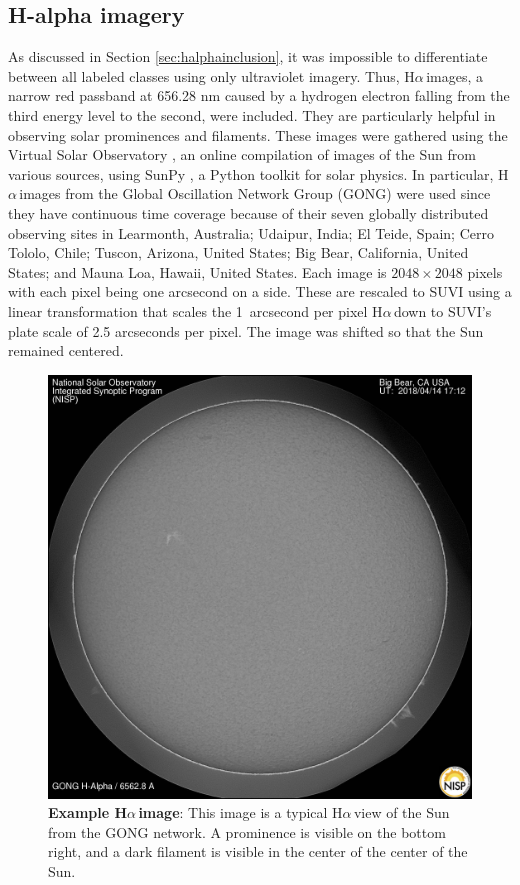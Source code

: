 \documentclass[twoside]{report}
\newcommand{\halpha}{H$\alpha$\,}
\begin{document}
\subsection{H-alpha imagery} 
As discussed in Section \ref{sec:halphainclusion}, it was impossible to differentiate between all labeled classes using only ultraviolet imagery. Thus, \halpha images, a narrow red passband at 656.28 nm caused by a hydrogen electron falling from the third energy level to the second, were included. They are particularly helpful in observing solar prominences and filaments. These images were gathered using the Virtual Solar Observatory \cite{vso}, an online compilation of images of the Sun from various sources, using SunPy \cite{sunpy, sunpyweb}, a Python toolkit for solar physics. In particular, \halpha images from the Global Oscillation Network Group (GONG) were used since they have continuous time coverage because of their seven globally distributed observing sites in Learmonth, Australia; Udaipur, India; El Teide, Spain; Cerro Tololo, Chile; Tuscon, Arizona, United States; Big Bear, California, United States; and Mauna Loa, Hawaii, United States. Each image is $2048\times2048$ pixels with each pixel being one arcsecond on a side. These are rescaled to SUVI using a linear transformation that scales the 1~arcsecond per pixel \halpha down to SUVI's plate scale of 2.5 arcseconds per pixel. The image was shifted so that the Sun remained centered.

\begin{figure}[ht]
  \begin{center}
    \includegraphics[scale=0.1]{example-halpha.jpg}
    \caption{{\bf Example \halpha image}: This image is a typical \halpha view of the Sun from the GONG network. A prominence is visible on the bottom right, and a dark filament is visible in the center of the center of the Sun.}
    \label{fig:halphaimage}
 \end{center}
\end{figure}
\end{document}
